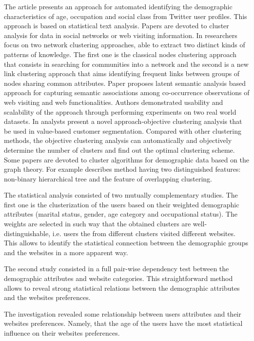 \documentclass[runningheads,a4paper]{llncs}
\begin{document}
The article \cite{sim-1} presents an approach for automated identifying the demographic characteristics of age, occupation and social class from Twitter user profiles. This approach is based on statistical text analysis. Papers \cite{sim-2,sim-3} are devoted to cluster analysis for data in social networks or web visiting information. In \cite{sim-2} researchers focus on two network clustering approaches, able to extract two distinct kinds of patterns of knowledge. The first one is the classical nodes clustering approach that consists in searching for communities into a network and the second is a new link clustering approach that aims identifying frequent links between groups of nodes sharing common attributes. Paper \cite{sim-3} proposes latent semantic analysis based approach for capturing semantic associations among co-occurrence observations of web visiting and web functionalities. Authors demonstrated usability and scalability of the approach through performing experiments on two real world datasets. In \cite{sim-4} analysts present a novel approach-objective clustering analysis that be used in value-based customer segmentation. Compared with other clustering methods, the objective clustering analysis can automatically and objectively determine the number of clusters and find out the optimal clustering scheme. Some papers are devoted to cluster algorithms for demographic data based on the graph theory. For example \cite{sim-5} describes method having two distinguished features: non-binary hierarchical tree and the feature of overlapping clustering.

The statistical analysis consisted of two mutually complementary studies. The first one is the clusterization of the users based on their weighted demographic attributes (marital status, gender, age category and occupational status). The weights are selected in such way that the obtained clusters are well-distinguishable, i.e. users the from different clusters visited different websites. This allows to identify the statistical connection between the demographic groups and the websites in a more apparent way.

The second study consisted in a full pair-wise dependency test between the demographic attributes and website categories. This straightforward method allows to reveal strong statistical relations between the demographic attributes and the websites preferences.

The investigation revealed some relationship between users attributes and their websites preferences. Namely, that the age of the users have the most statistical influence on their websites preferences.
\end{document}
